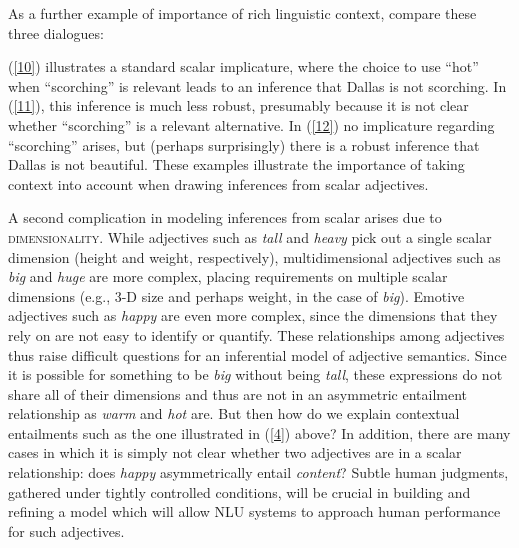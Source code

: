 \documentclass[10pt]{article}
\begin{document}
As a further example of importance of rich linguistic context, compare these three dialogues: 
 \vspace{-.1in}
\begin{multicols}{3}
\end{multicols}
 \vspace{-.1in}
\noindent
(\ref{10}) illustrates a standard scalar implicature, where the choice to use ``hot'' when ``scorching'' is relevant leads to an inference that Dallas is not scorching. In (\ref{11}), this inference is much less robust, presumably because it is not clear whether ``scorching'' is a relevant alternative. In (\ref{12}) no implicature regarding ``scorching'' arises, but (perhaps surprisingly) there is a robust inference that Dallas is not beautiful. These examples illustrate the importance of taking context into account when drawing inferences from scalar adjectives.

A second complication in modeling inferences from scalar arises due to \textsc{dimensionality}. While adjectives such as \emph{tall} and \emph{heavy} pick out a single scalar dimension (height and weight, respectively), multidimensional adjectives such as \emph{big} and \emph{huge} are more complex, placing requirements on multiple scalar dimensions (e.g., 3-D size and perhaps weight, in the case of \emph{big}). Emotive adjectives such as \emph{happy} are even more complex, since the dimensions that they rely on are not easy to identify or quantify. These relationships among adjectives thus raise difficult questions for an inferential model of adjective semantics. Since it is possible for something to be \emph{big} without being \emph{tall}, 
these expressions do not share all of their dimensions and thus are not in an asymmetric entailment relationship as \emph{warm} and \emph{hot} are. But then how do we explain contextual entailments such as the one illustrated in (\ref{4}) above? In addition, there are many cases in which it is simply not clear whether two adjectives are in a scalar relationship: does \emph{happy} asymmetrically entail \emph{content}? Subtle human judgments, gathered under tightly controlled conditions, will be crucial in building and refining a model which will allow NLU systems to approach human performance for such adjectives.
\end{document}
